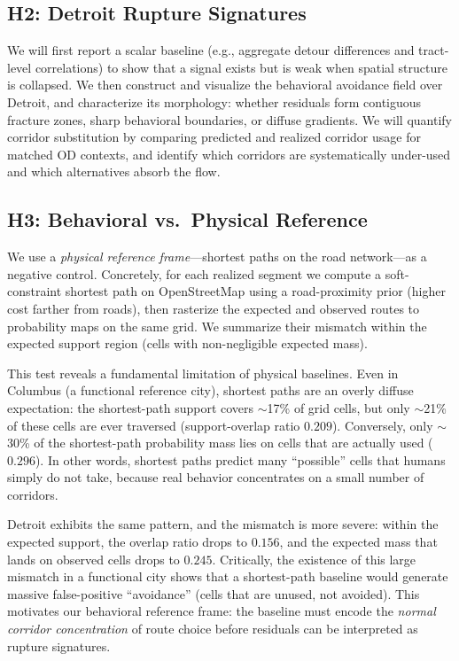 \subsection{H2: Detroit Rupture Signatures}
We will first report a scalar baseline (e.g., aggregate detour differences and tract-level correlations) to show that a signal exists but is weak when spatial structure is collapsed. We then construct and visualize the behavioral avoidance field over Detroit, and characterize its morphology: whether residuals form contiguous fracture zones, sharp behavioral boundaries, or diffuse gradients. We will quantify corridor substitution by comparing predicted and realized corridor usage for matched OD contexts, and identify which corridors are systematically under-used and which alternatives absorb the flow.

\subsection{H3: Behavioral vs.\ Physical Reference}
We use a \emph{physical reference frame}---shortest paths on the road network---as a negative control. Concretely, for each realized segment we compute a soft-constraint shortest path on OpenStreetMap using a road-proximity prior (higher cost farther from roads), then rasterize the expected and observed routes to probability maps on the same grid. We summarize their mismatch within the expected support region (cells with non-negligible expected mass).

This test reveals a fundamental limitation of physical baselines. Even in Columbus (a functional reference city), shortest paths are an overly diffuse expectation: the shortest-path support covers $\sim$17\% of grid cells, but only $\sim$21\% of these cells are ever traversed (support-overlap ratio $0.209$). Conversely, only $\sim$30\% of the shortest-path probability mass lies on cells that are actually used ($0.296$). In other words, shortest paths predict many ``possible'' cells that humans simply do not take, because real behavior concentrates on a small number of corridors.

Detroit exhibits the same pattern, and the mismatch is more severe: within the expected support, the overlap ratio drops to $0.156$, and the expected mass that lands on observed cells drops to $0.245$. Critically, the existence of this large mismatch in a functional city shows that a shortest-path baseline would generate massive false-positive ``avoidance'' (cells that are unused, not avoided). This motivates our behavioral reference frame: the baseline must encode the \emph{normal corridor concentration} of route choice before residuals can be interpreted as rupture signatures.

